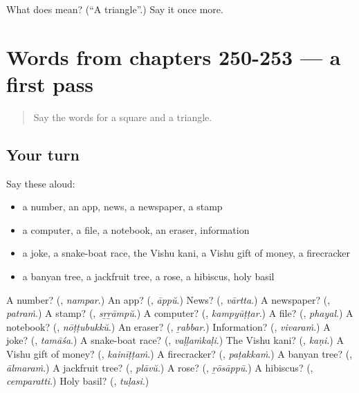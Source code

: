 \begin{tcolorbox}[breakable,colback=teal!4,colframe=teal!35!black,title={Before you move on}]
What does  mean? (\textquotedblleft{}A triangle\textquotedblright{}.) Say it once more.
\end{tcolorbox}
\section[(dialogue)]{Words from chapters 250-253 — a first pass}

\label{lesson:ML-R258-first-pass-words-from-chapters-250-253}



\begin{quote}
Say the words for a square and a triangle.
\end{quote}

\subsection*{Your turn}
Say these aloud:

\begin{itemize}
\raggedright
  \item a number, an app, news, a newspaper, a stamp
  \item a computer, a file, a notebook, an eraser, information
  \item a joke, a snake-boat race, the Vishu kani, a Vishu gift of money, a firecracker
  \item a banyan tree, a jackfruit tree, a rose, a hibiscus, holy basil
\end{itemize}

\begin{tcolorbox}[breakable,colback=teal!4,colframe=teal!35!black,title={Before you move on}]
A number? (\textbf{}, \emph{nampar}.) An app? (\textbf{}, \emph{āppŭ}.) News? (\textbf{}, \emph{vārtta}.) A newspaper? (\textbf{}, \emph{patraṁ}.) A stamp? (\textbf{}, \emph{sṟṟāmpŭ}.) A computer? (\textbf{}, \emph{kampyūṭṭar}.) A file? (\textbf{}, \emph{phayal}.) A notebook? (\textbf{}, \emph{nōṭṭubukkŭ}.) An eraser? (\textbf{}, \emph{ṟabbar}.) Information? (\textbf{}, \emph{vivaraṁ}.) A joke? (\textbf{}, \emph{tamāśa}.) A snake-boat race? (\textbf{}, \emph{vaḷḷaṁkaḷi}.) The Vishu kani? (\textbf{}, \emph{kaṇi}.) A Vishu gift of money? (\textbf{}, \emph{kainīṭṭaṁ}.) A firecracker? (\textbf{}, \emph{paṭakkaṁ}.) A banyan tree? (\textbf{}, \emph{ālmaraṁ}.) A jackfruit tree? (\textbf{}, \emph{plāvŭ}.) A rose? (\textbf{}, \emph{ṟōsāppū}.) A hibiscus? (\textbf{}, \emph{cemparatti}.) Holy basil? (\textbf{}, \emph{tuḷasi}.)
\end{tcolorbox}

